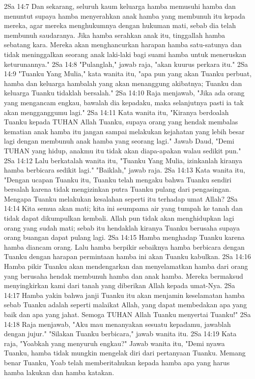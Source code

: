 2Sa 14:7  Dan sekarang, seluruh kaum keluarga hamba memusuhi hamba dan menuntut supaya hamba menyerahkan anak hamba yang membunuh itu kepada mereka, agar mereka menghukumnya dengan hukuman mati, sebab dia telah membunuh saudaranya. Jika hamba serahkan anak itu, tinggallah hamba sebatang kara. Mereka akan menghancurkan harapan hamba satu-satunya dan tidak meninggalkan seorang anak laki-laki bagi suami hamba untuk meneruskan keturunannya."
2Sa 14:8  "Pulanglah," jawab raja, "akan kuurus perkara itu."
2Sa 14:9  "Tuanku Yang Mulia," kata wanita itu, "apa pun yang akan Tuanku perbuat, hamba dan keluarga hambalah yang akan menanggung akibatnya; Tuanku dan keluarga Tuanku tidaklah bersalah."
2Sa 14:10  Raja menjawab, "Jika ada orang yang mengancam engkau, bawalah dia kepadaku, maka selanjutnya pasti ia tak akan mengganggumu lagi."
2Sa 14:11  Kata wanita itu, "Kiranya berdoalah Tuanku kepada TUHAN Allah Tuanku, supaya orang yang hendak membalas kematian anak hamba itu jangan sampai melakukan kejahatan yang lebih besar lagi dengan membunuh anak hamba yang seorang lagi." Jawab Daud, "Demi TUHAN yang hidup, anakmu itu tidak akan diapa-apakan walau sedikit pun."
2Sa 14:12  Lalu berkatalah wanita itu, "Tuanku Yang Mulia, izinkanlah kiranya hamba berbicara sedikit lagi." "Baiklah," jawab raja.
2Sa 14:13  Kata wanita itu, "Dengan ucapan Tuanku itu, Tuanku telah mengaku bahwa Tuanku sendiri bersalah karena tidak mengizinkan putra Tuanku pulang dari pengasingan. Mengapa Tuanku melakukan kesalahan seperti itu terhadap umat Allah?
2Sa 14:14  Kita semua akan mati; kita ini seumpama air yang tumpah ke tanah dan tidak dapat dikumpulkan kembali. Allah pun tidak akan menghidupkan lagi orang yang sudah mati; sebab itu hendaklah kiranya Tuanku berusaha supaya orang buangan dapat pulang lagi.
2Sa 14:15  Hamba menghadap Tuanku karena hamba diancam orang. Lalu hamba berpikir sebaiknya hamba berbicara dengan Tuanku dengan harapan permintaan hamba ini akan Tuanku kabulkan.
2Sa 14:16  Hamba pikir Tuanku akan mendengarkan dan menyelamatkan hamba dari orang yang berusaha hendak membunuh hamba dan anak hamba. Mereka bermaksud menyingkirkan kami dari tanah yang diberikan Allah kepada umat-Nya.
2Sa 14:17  Hamba yakin bahwa janji Tuanku itu akan menjamin keselamatan hamba sebab Tuanku adalah seperti malaikat Allah, yang dapat membedakan apa yang baik dan apa yang jahat. Semoga TUHAN Allah Tuanku menyertai Tuanku!"
2Sa 14:18  Raja menjawab, "Aku mau menanyakan sesuatu kepadamu, jawablah dengan jujur." "Silakan Tuanku berbicara," jawab wanita itu.
2Sa 14:19  Kata raja, "Yoabkah yang menyuruh engkau?" Jawab wanita itu, "Demi nyawa Tuanku, hamba tidak mungkin mengelak diri dari pertanyaan Tuanku. Memang benar Tuanku, Yoab telah memberitahukan kepada hamba apa yang harus hamba lakukan dan hamba katakan.
